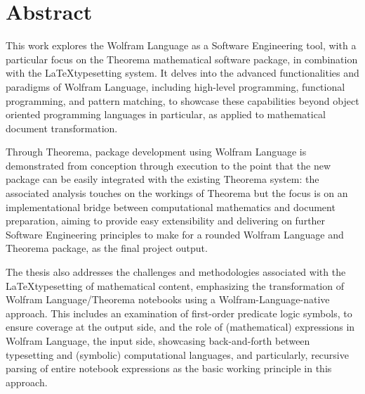 \chapter{Abstract}

This work explores the Wolfram Language as a Software Engineering tool, with a particular focus on the Theorema mathematical software package, in combination with the \LaTeX typesetting system. It delves into the advanced functionalities and paradigms of Wolfram Language, including high-level programming, functional programming, and pattern matching, to showcase these capabilities beyond object oriented programming languages in particular, as applied to mathematical document transformation. 

Through Theorema,  package development using Wolfram Language is demonstrated from conception through execution to the point that the new package can be easily integrated with the existing Theorema system: the associated analysis touches on the workings of Theorema but the focus is on an implementational bridge between computational mathematics and document preparation, aiming to provide easy extensibility and delivering on further Software Engineering principles to make for a rounded Wolfram Language and Theorema package, as the final project output.

The thesis also addresses the challenges and methodologies associated with the \LaTeX typesetting of mathematical content, emphasizing the transformation of Wolfram Language/Theorema notebooks using a Wolfram-Language-native approach. This includes an examination of first-order predicate logic symbols, to ensure coverage at the output side, and the role of (mathematical) expressions in Wolfram Language, the input side, showcasing back-and-forth between typesetting and (symbolic) computational languages, and particularly, recursive parsing of entire notebook expressions as the basic working principle in this approach. 
